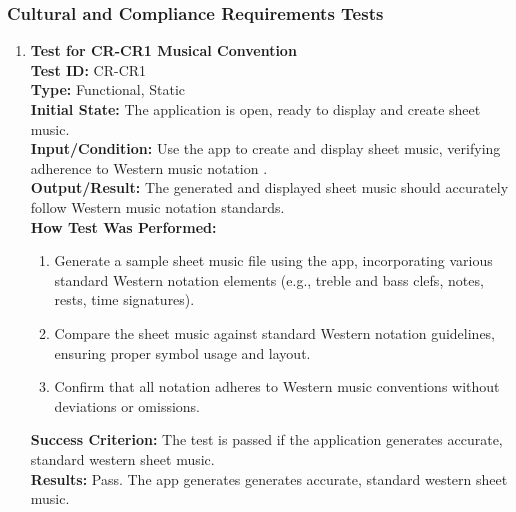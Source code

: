 \documentclass[12pt, titlepage]{article}
\begin{document}
\subsubsection{Cultural and Compliance Requirements Tests}
\begin{enumerate}
    \item \textbf{Test for CR-CR1 Musical Convention} \\
      \newline
      \textbf{Test ID:} CR-CR1 \\
      \textbf{Type:} Functional, Static \\
      \textbf{Initial State:} The application is open, ready to display and create sheet music. \\
      \textbf{Input/Condition:} Use the app to create and display sheet music, verifying adherence to Western music notation 
      \citep*{music-notation}. \\
      \textbf{Output/Result:} The generated and displayed sheet music should accurately follow Western music notation standards. \\
      \textbf{How Test Was Performed:}
      \begin{enumerate}
          \item Generate a sample sheet music file using the app, incorporating various standard Western notation elements 
          (e.g., treble and bass clefs, notes, rests, time signatures).
          \item Compare the sheet music against standard Western notation guidelines, ensuring proper symbol usage and layout.
          \item Confirm that all notation adheres to Western music conventions without deviations or omissions.
      \end{enumerate}
      \textbf{Success Criterion:} The test is passed if the application generates accurate, standard western sheet music.\\
      \textbf{Results:} Pass. The app generates generates accurate, standard western sheet music.\\


\end{enumerate}
\end{document}
